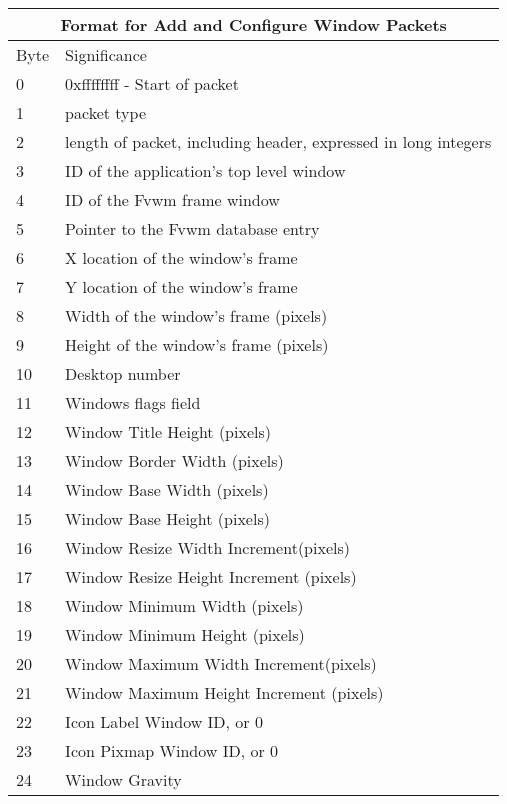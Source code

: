 \begin{table}
\begin{center}
\begin{tabular}[h]{|l|l|} \hline
\multicolumn{2}{|c|}{Format for Add and Configure Window Packets} \\ \hline
Byte &Significance \\\hline
0    & 0xffffffff - Start of packet \\
1    & packet type \\
2    & length of packet, including header, expressed in long integers
\\ \hline
3    & ID of the application's top level window \\
4    & ID of the Fvwm frame window \\
5    & Pointer to the Fvwm database entry \\
6    & X location of the window's frame \\
7    & Y location of the window's frame\\
8    & Width of the window's frame (pixels) \\
9    & Height of the window's frame (pixels) \\
10   & Desktop number\\ 
11   & Windows flags field\\
12   & Window Title Height (pixels) \\
13   & Window Border Width (pixels) \\
14   & Window Base Width (pixels) \\  
15   & Window Base Height (pixels) \\  
16   & Window Resize Width Increment(pixels) \\  
17   & Window Resize Height Increment (pixels) \\  
18   & Window Minimum Width (pixels) \\  
19   & Window Minimum Height (pixels) \\  
20   & Window Maximum Width Increment(pixels) \\  
21   & Window Maximum Height Increment (pixels) \\
22   & Icon Label Window ID, or 0\\
23   & Icon Pixmap Window ID, or 0\\ 
24   & Window Gravity\\  \hline
\end{tabular}
\end{center}
\end{table}


